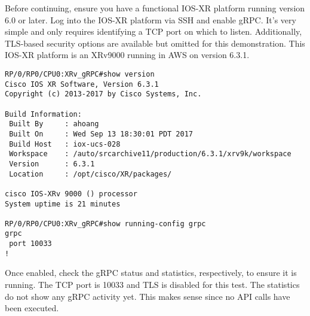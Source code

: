 Before continuing, ensure you have a functional IOS-XR platform running
version 6.0 or later. Log into the IOS-XR platform via SSH and enable gRPC\@.
It's very simple and only requires identifying a TCP port on which to listen.
Additionally, TLS-based security options are available but omitted for this
demonstration. This IOS-XR platform is an XRv9000 running in AWS on version 6.3.1.

\begin{verbatim}
RP/0/RP0/CPU0:XRv_gRPC#show version                  
Cisco IOS XR Software, Version 6.3.1
Copyright (c) 2013-2017 by Cisco Systems, Inc.

Build Information:
 Built By     : ahoang
 Built On     : Wed Sep 13 18:30:01 PDT 2017
 Build Host   : iox-ucs-028
 Workspace    : /auto/srcarchive11/production/6.3.1/xrv9k/workspace
 Version      : 6.3.1
 Location     : /opt/cisco/XR/packages/

cisco IOS-XRv 9000 () processor 
System uptime is 21 minutes

RP/0/RP0/CPU0:XRv_gRPC#show running-config grpc 
grpc
 port 10033
!
\end{verbatim}

Once enabled, check the gRPC status and statistics, respectively, to ensure it
is running. The TCP port is 10033 and TLS is disabled for this test. The
statistics do not show any gRPC activity yet. This makes sense since no API
calls have been executed.

